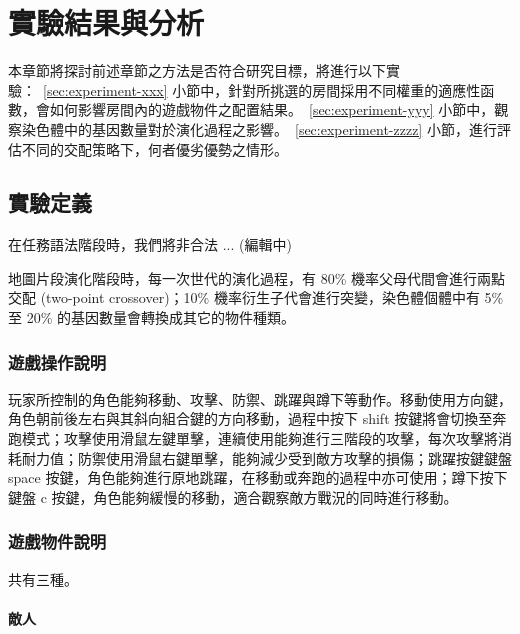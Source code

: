 \renewcommand\thetable{\arabic{chapter}-\arabic{table}}
\chapter{實驗結果與分析}
\label{cha:experiment}

本章節將探討前述章節之方法是否符合研究目標，將進行以下實驗：~\ref{sec:experiment-xxx} 小節中，針對所挑選的房間採用不同權重的適應性函數，會如何影響房間內的遊戲物件之配置結果。~\ref{sec:experiment-yyy} 小節中，觀察染色體中的基因數量對於演化過程之影響。~\ref{sec:experiment-zzzz} 小節，進行評估不同的交配策略下，何者優劣優勢之情形。

\section{實驗定義}
\label{sec:experiment-definition}

在任務語法階段時，我們將非合法 ... (編輯中)

地圖片段演化階段時，每一次世代的演化過程，有 80\% 機率父母代間會進行兩點交配 (two-point crossover)；10\% 機率衍生子代會進行突變，染色體個體中有 5\% 至 20\% 的基因數量會轉換成其它的物件種類。

\subsection{遊戲操作說明}
\label{ssec:experiment-gameplaymanual}

玩家所控制的角色能夠移動、攻擊、防禦、跳躍與蹲下等動作。移動使用方向鍵，角色朝前後左右與其斜向組合鍵的方向移動，過程中按下 shift 按鍵將會切換至奔跑模式；攻擊使用滑鼠左鍵單擊，連續使用能夠進行三階段的攻擊，每次攻擊將消耗耐力值；防禦使用滑鼠右鍵單擊，能夠減少受到敵方攻擊的損傷；跳躍按鍵鍵盤 space 按鍵，角色能夠進行原地跳躍，在移動或奔跑的過程中亦可使用；蹲下按下鍵盤 c 按鍵，角色能夠緩慢的移動，適合觀察敵方戰況的同時進行移動。

\subsection{遊戲物件說明}
\label{ssec:experiment-gameobjects}

共有三種。

\subsubsection{敵人}
\label{sssec:experiment-gameobjects-enemy}

